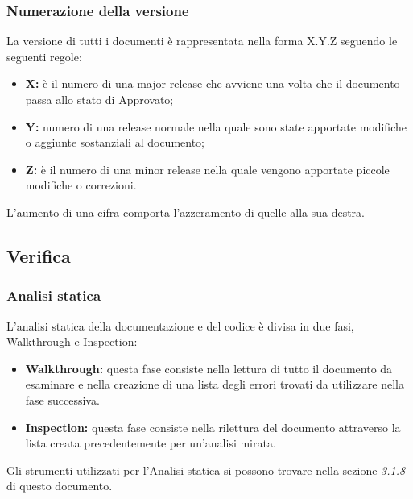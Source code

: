 		\subsubsection{Numerazione della versione}
		\label{3.2.2}
			La versione di tutti i documenti è rappresentata nella forma X.Y.Z seguendo le seguenti regole:
			\begin{itemize}
				\item \textbf{X:} è il numero di una major release che avviene una volta che il documento passa allo stato di Approvato;
				\item \textbf{Y:} numero di una release normale nella quale sono state apportate modifiche o aggiunte sostanziali al documento;
				\item \textbf{Z:} è il numero di una minor release nella quale vengono apportate piccole modifiche o correzioni.
			\end{itemize}
		L'aumento di una cifra comporta l'azzeramento di quelle alla sua destra. \newline
		
	\subsection{Verifica}
		\subsubsection{Analisi statica}
			L'analisi statica della documentazione e del codice è divisa in due fasi, Walkthrough e Inspection:
			\begin{itemize}
				\item \textbf{Walkthrough:} questa fase consiste nella lettura di tutto il documento da esaminare e nella creazione di una lista degli errori trovati da utilizzare nella fase successiva.
				\item \textbf{Inspection:} questa fase consiste nella rilettura del documento attraverso la lista creata precedentemente per un'analisi mirata. \newline
			\end{itemize}
		Gli strumenti utilizzati per l'Analisi statica si possono trovare nella sezione \hyperref[3.1.8]{\textit{\underline{3.1.8}}} di questo documento.\newline
